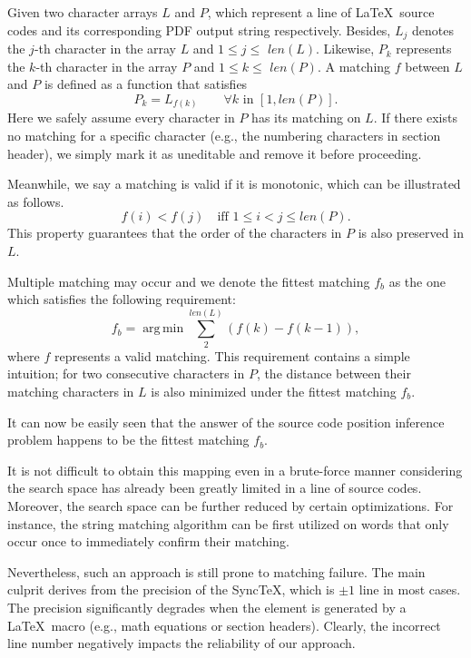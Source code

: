 \documentclass[sigconf]{acmart}
\DeclareMathOperator*{\argmin}{arg\,min}
\begin{document}
Given two character arrays $L$ and $P$, which represent a line of \LaTeX\ source codes and its corresponding PDF output string respectively. 
Besides, $L_j$ denotes the $j$-th character in the array $L$ and $ 1 \le j \le $ $len(L)$. 
Likewise, $P_k$ represents the $k$-th character in the array $P$ and $ 1 \le k \le $ $len(P)$. 
A matching $f$ between $L$ and $P$ is defined as a function that satisfies 
\begin{equation}
P_k = L_{f(k)}  \quad \quad \forall k \text{ in } [1, len(P)].
\end{equation}
Here we safely assume every character in $P$ has its matching on $L$. 
If there exists no matching for a specific character (e.g., the numbering characters in section header), we simply mark it as uneditable and remove it before proceeding. 

Meanwhile, we say a matching is valid if it is monotonic, which can be illustrated as follows.
\begin{equation}
f(i) < f(j)  \quad \text{iff } 1 \le i < j \le len(P).
\end{equation}
This property guarantees that the order of the characters in $P$ is also preserved in $L$.


Multiple matching may occur and we denote the fittest matching $f_b$ as the one which satisfies the following requirement:
\begin{equation}
f_b = \argmin \sum_{2}^{len(L)}(f(k) - f(k-1)),
\end{equation}
where $f$ represents a valid matching.
This requirement contains a simple intuition; for two consecutive characters in $P$, the distance between their matching characters in $L$ is also minimized under the fittest matching $f_b$. 


It can now be easily seen that the answer of the source code position inference problem happens to be the fittest matching $f_b$.

It is not difficult to obtain this mapping even in a brute-force manner considering the search space has already been greatly limited in a line of source codes.
Moreover, the search space can be further reduced by certain optimizations. For instance, the string matching algorithm can be first utilized on words that only occur once to immediately confirm their matching. 

Nevertheless, such an approach is still prone to matching failure. 
The main culprit derives from the precision of the Sync\TeX, which is $\pm 1$ line \cite{laurens2008direct} in most cases. 
The precision significantly degrades when the element is generated by a \LaTeX\ macro (e.g.,  math equations or section headers). 
Clearly, the incorrect line number negatively impacts the reliability of our approach.
\end{document}
